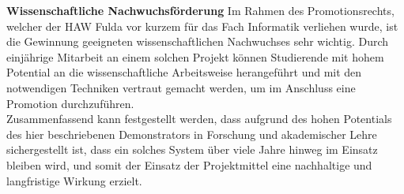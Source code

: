 \documentclass[11pt]{article}
\begin{document}
\textbf{Wissenschaftliche Nachwuchsförderung} Im Rahmen des Promotionsrechts, welcher der HAW Fulda vor kurzem für das Fach Informatik verliehen wurde, ist die Gewinnung geeigneten wissenschaftlichen Nachwuchses sehr wichtig. Durch einjährige Mitarbeit an einem solchen Projekt können Studierende mit hohem Potential an die wissenschaftliche Arbeitsweise herangeführt und mit den notwendigen Techniken vertraut gemacht werden, um im Anschluss eine Promotion durchzuführen.\\

Zusammenfassend kann festgestellt werden, dass aufgrund des hohen Potentials des hier beschriebenen Demonstrators in Forschung und akademischer Lehre sichergestellt ist, dass ein solches System über viele Jahre hinweg im Einsatz bleiben wird, und somit der Einsatz der Projektmittel eine nachhaltige und langfristige Wirkung erzielt.
%

\newpage
\renewcommand{\thesection}{5}
\end{document}
